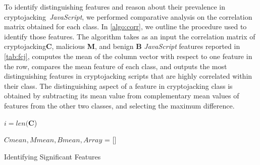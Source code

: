 \documentclass[acmlarge]{acmart}
\newcommand{\js}{{\em JavaScript}\xspace}
\newcommand{\cj}{cryptojacking\xspace}
\begin{document}
To identify distinguishing features and reason about their prevalence in \cj~\js, we performed comparative analysis on the correlation matrix obtained for each class. In \autoref{algo:corr}, we outline the procedure used to identify those features. The algorithm takes as an input the correlation matrix of \cj \textbf{C}, malicious \textbf{M}, and benign \textbf{B} \js features reported in \autoref{tab:fcj}, computes the mean of the column vector with respect to one feature in the row, compares the mean feature of each class, and outputs the most distinguishing features in \cj scripts that are highly correlated within their class. The distinguishing aspect of a feature in cryptojacking class is obtained by subtracting its mean value from complementary mean values of features from the other two classes, and selecting the maximum difference.


\begin{algorithm}[t]  

$i = len(\textbf{C}$)\;

$Cmean,Mmean,Bmean,Array$ = []\;


  \caption{Identifying Significant Features}
\label{algo:corr}
\end{algorithm}
\end{document}
